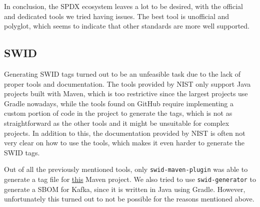 In conclusion, the SPDX ecosystem leaves a lot to be desired, with the official and dedicated tools we tried having issues. The best tool is unofficial and polyglot, which seems to indicate that other standards are more well supported.

\subsection{SWID} \label{results:swid}
Generating SWID tags turned out to be an unfeasible task due to the lack of proper tools and documentation. The tools provided by NIST only support Java projects built with Maven, which is too restrictive since the largest projects use Gradle nowadays, while the tools found on GitHub require implementing a custom portion of code in the project to generate the tags, which is not as straightforward as the other tools and it might be unsuitable for complex projects.
In addition to this, the documentation provided by NIST is often not very clear on how to use the tools, which makes it even harder to generate the SWID tags.

Out of all the previously mentioned tools, only \verb|swid-maven-plugin| was able to generate a tag file for \href{https://github.com/MithunTechnologiesDevOps/maven-web-application}{this} Maven project.
We also tried to use \verb|swid-generator| to generate a SBOM for Kafka, since it is written in Java using Gradle. However, unfortunately this turned out to not be possible for the reasons mentioned above.
